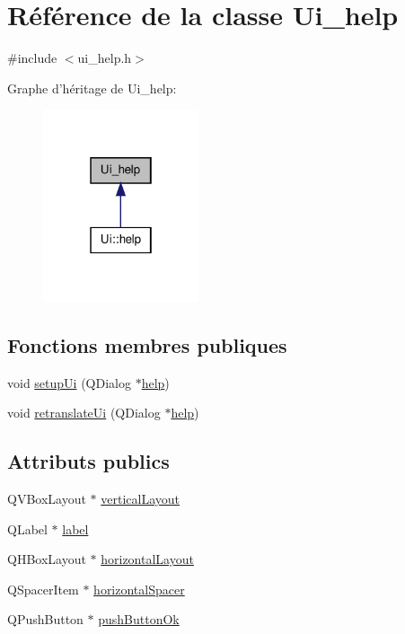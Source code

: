 \hypertarget{class_ui__help}{\section{Référence de la classe Ui\-\_\-help}
\label{class_ui__help}
}


{\ttfamily \#include $<$ui\-\_\-help.\-h$>$}



Graphe d'héritage de Ui\-\_\-help\-:\nopagebreak
\begin{figure}[H]
\begin{center}
\leavevmode
\includegraphics[width=130pt]{class_ui__help__inherit__graph}
\end{center}
\end{figure}
\subsection*{Fonctions membres publiques}
\begin{DoxyCompactItemize}
\item 
void \hyperlink{class_ui__help_a4b1ab1bb9e72c9cadb00adf41be9ed0c}{setup\-Ui} (Q\-Dialog $\ast$\hyperlink{classhelp}{help})
\item 
void \hyperlink{class_ui__help_aa206e4e7e7ed5622b8ec847f7f43c484}{retranslate\-Ui} (Q\-Dialog $\ast$\hyperlink{classhelp}{help})
\end{DoxyCompactItemize}
\subsection*{Attributs publics}
\begin{DoxyCompactItemize}
\item 
Q\-V\-Box\-Layout $\ast$ \hyperlink{class_ui__help_ac1a3b742bcbdbc9e70a5e6e08adbb4e8}{vertical\-Layout}
\item 
Q\-Label $\ast$ \hyperlink{class_ui__help_af99c4c1b7bfbb43884cd3596f02528b3}{label}
\item 
Q\-H\-Box\-Layout $\ast$ \hyperlink{class_ui__help_ae47b0270992783a661fb371d0addefc5}{horizontal\-Layout}
\item 
Q\-Spacer\-Item $\ast$ \hyperlink{class_ui__help_a417e3c081fd384c5c48d0c6b5a4046ce}{horizontal\-Spacer}
\item 
Q\-Push\-Button $\ast$ \hyperlink{class_ui__help_a983ef178586664d76676080244d903b2}{push\-Button\-Ok}
\end{DoxyCompactItemize}


